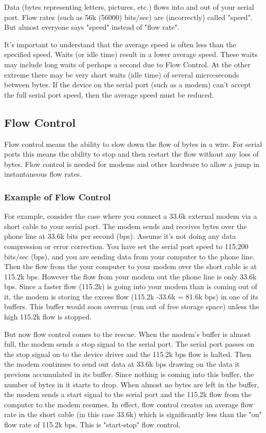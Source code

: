 \documentclass[11pt, twosides, titlepage]{article}
\begin{document}
        Data (bytes representing letters, pictures, etc.) flows into and out of your serial port. Flow rates (such as 56k (56000) bits/sec) are (incorrectly) called "speed". But almost everyone says "speed" instead of "flow rate".

        It's important to understand that the average speed is often less than the specified speed. Waits (or idle time) result in a lower average speed. These waits may include long waits of perhaps a second due to Flow Control. At the other extreme there may be very short waits (idle time) of several micro-seconds between bytes. If the device on the serial port (such as a modem) can't accept the full serial port speed, then the average speed must be reduced.
        
    \subsection{Flow Control}

        Flow control means the ability to slow down the flow of bytes in a wire. For serial ports this means the ability to stop and then restart the flow without any loss of bytes. Flow control is needed for modems and other hardware to allow a jump in instantaneous flow rates.

        \subsubsection{Example of Flow Control}

            For example, consider the case where you connect a 33.6k external modem via a short cable to your serial port. The modem sends and receives bytes over the phone line at 33.6k bits per second (bps). Assume it's not doing any data compression or error correction. You have set the serial port speed to 115,200 bits/sec (bps), and you are sending data from your computer to the phone line. Then the flow from the your computer to your modem over the short cable is at 115.2k bps. However the flow from your modem out the phone line is only 33.6k bps. Since a faster flow (115.2k) is going into your modem than is coming out of it, the modem is storing the excess flow (115.2k -33.6k = 81.6k bps) in one of its buffers. This buffer would soon overrun (run out of free storage space) unless the high 115.2k flow is stopped.

            But now flow control comes to the rescue. When the modem's buffer is almost full, the modem sends a stop signal to the serial port. The serial port passes on the stop signal on to the device driver and the 115.2k bps flow is halted. Then the modem continues to send out data at 33.6k bps drawing on the data it previous accumulated in its buffer. Since nothing is coming into this buffer, the number of bytes in it starts to drop. When almost no bytes are left in the buffer, the modem sends a start signal to the serial port and the 115.2k flow from the computer to the modem resumes. In effect, flow control creates an average flow rate in the short cable (in this case 33.6k) which is significantly less than the "on" flow rate of 115.2k bps. This is "start-stop" flow control.
            
\end{document}
